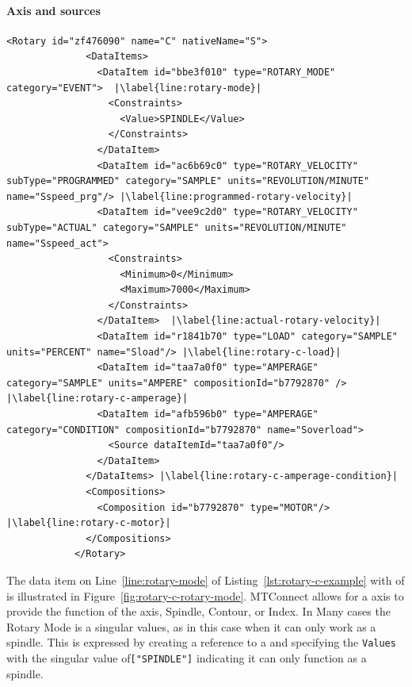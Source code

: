 \FloatBarrier

\paragraph{ Axis and  sources}

\begin{lstlisting}[firstnumber=last,%
    caption={Rotary C Axis},label={lst:rotary-c-example},escapechar=|]
            <Rotary id="zf476090" name="C" nativeName="S">
              <DataItems>
                <DataItem id="bbe3f010" type="ROTARY_MODE" category="EVENT">  |\label{line:rotary-mode}|
                  <Constraints>
                    <Value>SPINDLE</Value>
                  </Constraints>
                </DataItem>
                <DataItem id="ac6b69c0" type="ROTARY_VELOCITY" subType="PROGRAMMED" category="SAMPLE" units="REVOLUTION/MINUTE" name="Sspeed_prg"/> |\label{line:programmed-rotary-velocity}|
                <DataItem id="vee9c2d0" type="ROTARY_VELOCITY" subType="ACTUAL" category="SAMPLE" units="REVOLUTION/MINUTE" name="Sspeed_act"> 
                  <Constraints>
                    <Minimum>0</Minimum>
                    <Maximum>7000</Maximum>
                  </Constraints>
                </DataItem>  |\label{line:actual-rotary-velocity}|
                <DataItem id="r1841b70" type="LOAD" category="SAMPLE" units="PERCENT" name="Sload"/> |\label{line:rotary-c-load}|
                <DataItem id="taa7a0f0" type="AMPERAGE" category="SAMPLE" units="AMPERE" compositionId="b7792870" /> |\label{line:rotary-c-amperage}|
                <DataItem id="afb596b0" type="AMPERAGE" category="CONDITION" compositionId="b7792870" name="Soverload">
                  <Source dataItemId="taa7a0f0"/>
                </DataItem>
              </DataItems> |\label{line:rotary-c-amperage-condition}|
              <Compositions>
                <Composition id="b7792870" type="MOTOR"/> |\label{line:rotary-c-motor}|
              </Compositions>
            </Rotary>
\end{lstlisting}

The data item on Line~\ref{line:rotary-mode} of Listing~\ref{lst:rotary-c-example} with  of  is illustrated in Figure~\ref{fig:rotary-c-rotary-mode}. MTConnect allows for a  axis to provide the function of the axis, Spindle, Contour, or Index. In Many cases the Rotary Mode is a singular values, as in this case when it can only work as a spindle. This is expressed by creating a  reference to a   and specifying the \texttt{Values}   with the singular value of\texttt{["SPINDLE"]} indicating it can only function as a spindle. 

